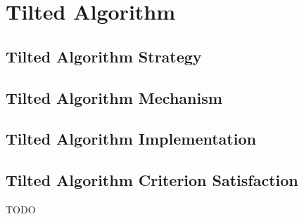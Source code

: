 \section{Tilted Algorithm} \label{sec:tilted}

\subsection{Tilted Algorithm Strategy}

\label{sec:tilted-strategy}



\subsection{Tilted Algorithm Mechanism}
\label{sec:tilted-mechanism}











\subsection{Tilted Algorithm Implementation}
\label{sec:tilted-implementation}



\subsection{Tilted Algorithm Criterion Satisfaction}
\label{sec:tilted-satisfaction}

TODO
